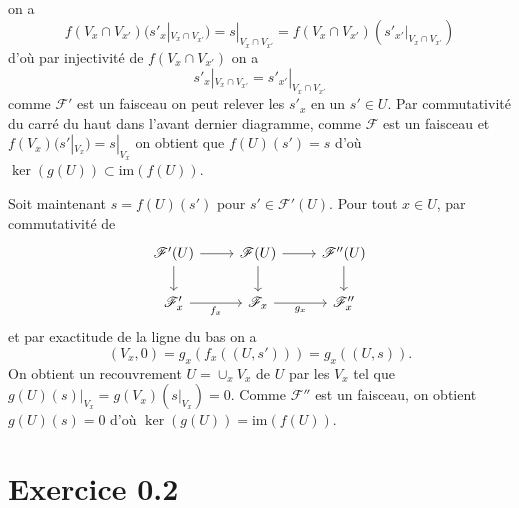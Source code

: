 \documentclass[a4paper,12pt]{article}
\newcommand{\F}{\mathscr F}
\newcommand{\im}{\textrm{im}}
\theoremstyle{plain}
\theoremstyle{definition}
\theoremstyle{remark}
\begin{document}
on a 
\[f(V_x\cap V_{x'})(s'_x|_{V_x\cap V_{x'}})=s|_{V_x\cap V_{x'}}=
f(V_x\cap V_{x'})(s'_{x'}|_{V_x\cap V_{x'}})\]
d'où par injectivité de $f(V_x\cap V_{x'})$ on a 
\[s'_x|_{V_x\cap V_{x'}}=s'_{x'}|_{V_x\cap V_{x'}}\]
comme $\F'$ est un faisceau on peut relever les $s'_x$ en un $s'\in U$.
Par commutativité du carré du haut dans l'avant dernier diagramme, comme
$\F$ est un faisceau et $f(V_x)(s'|_{V_x})=s|_{V_x}$ on obtient que
$f(U)(s')=s$ d'où $\ker(g(U))\subset \im(f(U))$. 

Soit maintenant $s=f(U)(s')$ pour $s'\in \F'(U)$. Pour tout $x\in U$,
par commutativité de 
\[\begin{tikzcd}
	{\F'(U)} & {\F(U)} & {\F''(U)} \\
	{\F'_x} & {\F_x} & {\F''_x}
	\arrow[from=1-1, to=1-2]
	\arrow[from=1-1, to=2-1]
	\arrow[from=1-2, to=1-3]
	\arrow[from=1-2, to=2-2]
	\arrow[from=1-3, to=2-3]
	\arrow["{f_x}"', from=2-1, to=2-2]
	\arrow["{g_x}"', from=2-2, to=2-3]
\end{tikzcd}\]
et par exactitude de la ligne du bas on a 
\[(V_x,0)=g_x(f_x((U,s')))=g_x((U,s)).\]
On obtient un recouvrement 
$U=\cup_x V_x$ de $U$ par les $V_x$ tel que 
$g(U)(s)|_{V_x}=g(V_x)(s|_{V_x})=0$.
Comme $\F''$ est un faisceau, on obtient $g(U)(s)=0$ d'où 
$\ker(g(U))=\im(f(U))$.

\section*{Exercice 0.2}
\end{document}
